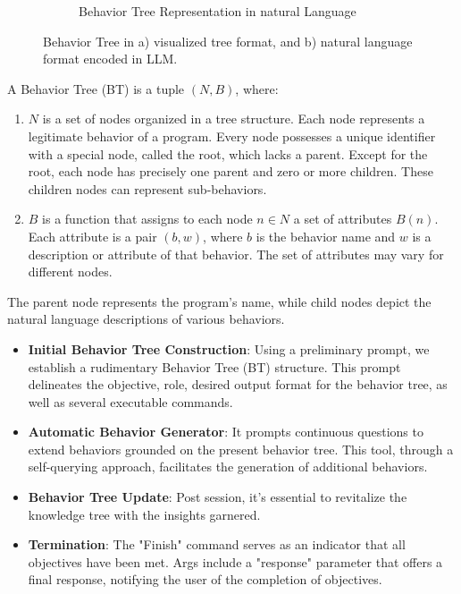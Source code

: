 \begin{figure}[h]
\begin{subfigure}{0.48\textwidth}
    \caption{Behavior Tree Representation in natural Language}
    \end{subfigure}
    \vspace{-0.05in}
    \caption{Behavior Tree in a) visualized tree format, and b) natural language format encoded in LLM.}
    \label{fig-framework}
    \vspace{-0.15in}
    \end{figure}

\begin{definition}
A Behavior Tree (BT) is a tuple \((N, B)\), where:
\begin{enumerate}
    \item \(N\) is a set of nodes organized in a tree structure. Each node represents a legitimate behavior of a program. Every node possesses a unique identifier with a special node, called the root, which lacks a parent. Except for the root, each node has precisely one parent and zero or more children. These children nodes can represent sub-behaviors.
    \item \(B\) is a function that assigns to each node \(n \in N\) a set of attributes \(B(n)\). Each attribute is a pair \((b, w)\), where \(b\) is the behavior name and \(w\) is a description or attribute of that behavior. The set of attributes may vary for different nodes.
\end{enumerate}
The parent node represents the program's name, while child nodes depict the natural language descriptions of various behaviors.
\end{definition}

\begin{itemize}
    \item \textbf{Initial Behavior Tree Construction}: Using a preliminary prompt, we establish a rudimentary Behavior Tree (BT) structure. This prompt delineates the objective, role, desired output format for the behavior tree, as well as several executable commands. 
    \item \textbf{Automatic Behavior Generator}: It prompts continuous questions to extend behaviors grounded on the present behavior tree. This tool, through a self-querying approach, facilitates the generation of additional behaviors.
    \item \textbf{Behavior Tree Update}: Post session, it's essential to revitalize the knowledge tree with the insights garnered.
    \item \textbf{Termination}: The "Finish" command serves as an indicator that all objectives have been met. Args include a "response" parameter that offers a final response, notifying the user of the completion of objectives.
\end{itemize}


